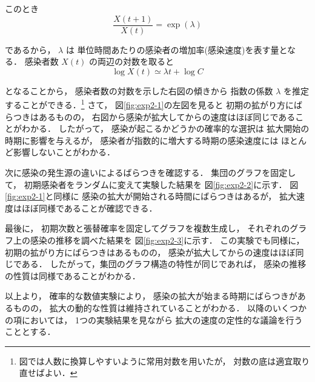 \documentclass[10pt,oneside]{scrartcl}
\begin{document}
このとき
\begin{equation}
  \frac{X(t+1)}{X(t)}
  =\exp(\lambda)
\end{equation}

であるから，
\(\lambda\) は
単位時間あたりの感染者の増加率(感染速度)を表す量となる．
感染者数 \(X(t)\) の両辺の対数を取ると
\begin{equation}
  \log X(t) \simeq \lambda t + \log C
\end{equation}

となることから，
感染者数の対数を示した右図の傾きから
指数の係数 \(\lambda\) を推定することができる．\footnote{図では人数に換算しやすいように常用対数を用いたが，
対数の底は適宜取り直せばよい．}
さて，
図\ref{fig:exp2-1}の左図を見ると
初期の拡がり方にばらつきはあるものの，
右図から感染が拡大してからの速度はほぼ同じであることがわかる．
したがって，
感染が起こるかどうかの確率的な選択は
拡大開始の時期に影響を与えるが，
感染者が指数的に増大する時期の感染速度には
ほとんど影響しないことがわかる．

\begin{figure*}%
  \centering
\end{figure*}

次に感染の発生源の違いによるばらつきを確認する．
集団のグラフを固定して，
初期感染者をランダムに変えて実験した結果を
図\ref{fig:exp2-2}に示す．
図\ref{fig:exp2-1}と同様に
感染の拡大が開始される時間にばらつきはあるが，
拡大速度はほぼ同様であることが確認できる．

\begin{figure*}%
  \centering
\end{figure*}

最後に，
初期次数と張替確率を固定してグラフを複数生成し，
それぞれのグラフ上の感染の推移を調べた結果を
図\ref{fig:exp2-3}に示す．
この実験でも同様に，
初期の拡がり方にばらつきはあるものの，
感染が拡大してからの速度はほぼ同じである．
したがって，集団のグラフ構造の特性が同じであれば，
感染の推移の性質は同様であることがわかる．

以上より，
確率的な数値実験により，
感染の拡大が始まる時期にばらつきがあるものの，
拡大の動的な性質は維持されていることがわかる．
以降のいくつかの項においては，
1つの実験結果を見ながら
拡大の速度の定性的な議論を行うこととする．
\end{document}
